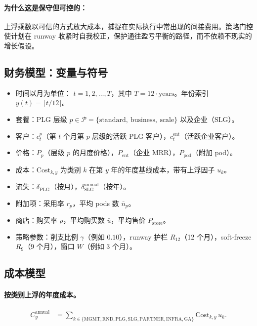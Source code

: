 \documentclass[11pt, a4paper, oneside]{article}
\begin{document}
\paragraph{为什么这是保守但可控的：}
上浮乘数以可信的方式放大成本，捕捉在实际执行中常出现的间接费用。策略门控使计划在 runway 收紧时自我校正，保护通往盈亏平衡的路径，而不依赖不现实的增长假设。

\subsection{财务模型：变量与符号}
\begin{itemize}
  \item 时间以月为单位： $t = 1,2,\dots,T$，其中 $T = 12 \cdot \text{years}$。年份索引 $y(t) = \lceil t/12 \rceil$。
  \item 套餐：PLG 层级 $p \in \mathcal{P}=\{\text{standard},\ \text{business},\ \text{scale}\}$ 以及企业（SLG）。
  \item 客户：$c^p_t$（第 $t$ 个月第 $p$ 层级的活跃 PLG 客户），$c^{\mathrm{ent}}_t$（活跃企业客户）。
  \item 价格：$P_p$（层级 $p$ 的月度价格），$P_{\mathrm{ent}}$（企业 MRR），$P_{\mathrm{pod}}$（附加 pod）。
  \item 成本：$\mathrm{Cost}_{k,y}$ 为类别 $k$ 在第 $y$ 年的年度基线成本，带有上浮因子 $u_k$。
  \item 流失：$\delta_{\mathrm{PLG}}$（按月），$\delta^{\mathrm{annual}}_{\mathrm{SLG}}$（按年）。
  \item 附加项：采用率 $r_p$，平均 pods 数 $\bar{n}_p$。
  \item 商店：购买率 $\rho$，平均购买数 $\bar{u}$，平均售价 $P_{\mathrm{store}}$。
  \item 策略参数：削支比例 $\gamma$（例如 $0.10$），runway 护栏 $R_{12}$（12 个月），soft-freeze $R_{9}$（9 个月），窗口 $W$（例如 $3$ 个月）。
\end{itemize}

\newpage
\subsection{成本模型}
\paragraph{按类别上浮的年度成本。}
\begin{align}
C^{\mathrm{annual}}_y 
  &= \sum_{k \in \{\mathrm{MGMT},\mathrm{RND},\mathrm{PLG},\mathrm{SLG},\mathrm{PARTNER},\mathrm{INFRA},\mathrm{GA}\}}
     \mathrm{Cost}_{k,y}\, u_k.
\end{align}
\end{document}
